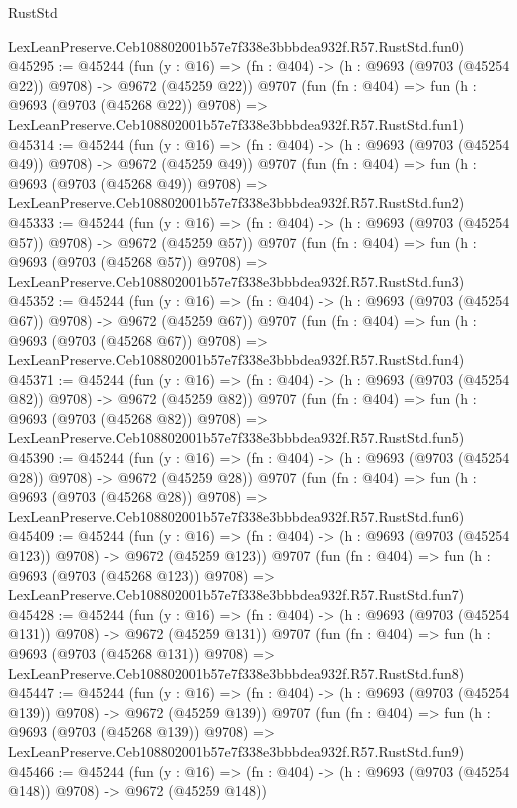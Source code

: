 \begin{lexlean}{RustStd}
\begin{coremodule}
    LexLeanPreserve.Ceb108802001b57e7f338e3bbbdea932f.R57.RustStd.fun0)
@45295 := @45244
    (fun (y : @16) => (fn : @404) -> (h : @9693 (@9703 (@45254 @22)) @9708) -> @9672 (@45259 @22))
    @9707
    (fun (fn : @404) =>
    fun (h : @9693 (@9703 (@45268 @22)) @9708) =>
    LexLeanPreserve.Ceb108802001b57e7f338e3bbbdea932f.R57.RustStd.fun1)
@45314 := @45244
    (fun (y : @16) => (fn : @404) -> (h : @9693 (@9703 (@45254 @49)) @9708) -> @9672 (@45259 @49))
    @9707
    (fun (fn : @404) =>
    fun (h : @9693 (@9703 (@45268 @49)) @9708) =>
    LexLeanPreserve.Ceb108802001b57e7f338e3bbbdea932f.R57.RustStd.fun2)
@45333 := @45244
    (fun (y : @16) => (fn : @404) -> (h : @9693 (@9703 (@45254 @57)) @9708) -> @9672 (@45259 @57))
    @9707
    (fun (fn : @404) =>
    fun (h : @9693 (@9703 (@45268 @57)) @9708) =>
    LexLeanPreserve.Ceb108802001b57e7f338e3bbbdea932f.R57.RustStd.fun3)
@45352 := @45244
    (fun (y : @16) => (fn : @404) -> (h : @9693 (@9703 (@45254 @67)) @9708) -> @9672 (@45259 @67))
    @9707
    (fun (fn : @404) =>
    fun (h : @9693 (@9703 (@45268 @67)) @9708) =>
    LexLeanPreserve.Ceb108802001b57e7f338e3bbbdea932f.R57.RustStd.fun4)
@45371 := @45244
    (fun (y : @16) => (fn : @404) -> (h : @9693 (@9703 (@45254 @82)) @9708) -> @9672 (@45259 @82))
    @9707
    (fun (fn : @404) =>
    fun (h : @9693 (@9703 (@45268 @82)) @9708) =>
    LexLeanPreserve.Ceb108802001b57e7f338e3bbbdea932f.R57.RustStd.fun5)
@45390 := @45244
    (fun (y : @16) => (fn : @404) -> (h : @9693 (@9703 (@45254 @28)) @9708) -> @9672 (@45259 @28))
    @9707
    (fun (fn : @404) =>
    fun (h : @9693 (@9703 (@45268 @28)) @9708) =>
    LexLeanPreserve.Ceb108802001b57e7f338e3bbbdea932f.R57.RustStd.fun6)
@45409 := @45244
    (fun (y : @16) => (fn : @404) -> (h : @9693 (@9703 (@45254 @123)) @9708) -> @9672 (@45259 @123))
    @9707
    (fun (fn : @404) =>
    fun (h : @9693 (@9703 (@45268 @123)) @9708) =>
    LexLeanPreserve.Ceb108802001b57e7f338e3bbbdea932f.R57.RustStd.fun7)
@45428 := @45244
    (fun (y : @16) => (fn : @404) -> (h : @9693 (@9703 (@45254 @131)) @9708) -> @9672 (@45259 @131))
    @9707
    (fun (fn : @404) =>
    fun (h : @9693 (@9703 (@45268 @131)) @9708) =>
    LexLeanPreserve.Ceb108802001b57e7f338e3bbbdea932f.R57.RustStd.fun8)
@45447 := @45244
    (fun (y : @16) => (fn : @404) -> (h : @9693 (@9703 (@45254 @139)) @9708) -> @9672 (@45259 @139))
    @9707
    (fun (fn : @404) =>
    fun (h : @9693 (@9703 (@45268 @139)) @9708) =>
    LexLeanPreserve.Ceb108802001b57e7f338e3bbbdea932f.R57.RustStd.fun9)
@45466 := @45244
    (fun (y : @16) => (fn : @404) -> (h : @9693 (@9703 (@45254 @148)) @9708) -> @9672 (@45259 @148))

\end{coremodule}
\end{lexlean}
